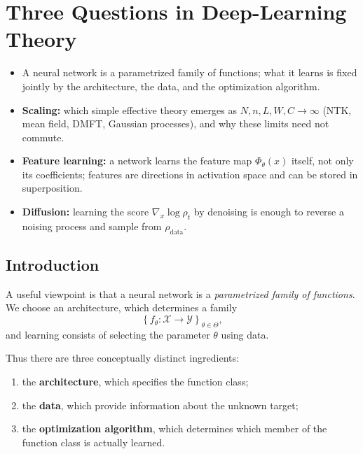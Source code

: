 \chapter{Three Questions in Deep-Learning Theory}
\label{ch:lecture1}

\begin{keyideas}
\begin{itemize}
    \item A neural network is a parametrized family of functions; what it
    learns is fixed jointly by the architecture, the data, and the
    optimization algorithm.
    \item \textbf{Scaling:} which simple effective theory emerges as
    $N,n,L,W,C\to\infty$ (NTK, mean field, DMFT, Gaussian processes), and
    why these limits need not commute.
    \item \textbf{Feature learning:} a network learns the feature map
    $\Phi_\theta(x)$ itself, not only its coefficients; features are
    directions in activation space and can be stored in superposition.
    \item \textbf{Diffusion:} learning the score $\nabla_x\log\rho_t$ by
    denoising is enough to reverse a noising process and sample from
    $\rho_{\mathrm{data}}$.
\end{itemize}
\end{keyideas}

\section{Introduction}

A useful viewpoint is that a neural network is a \emph{parametrized family of functions}. 
We choose an architecture, which determines a family
\begin{equation}
    \left\{
    f_\theta:\mathcal X\rightarrow\mathcal Y
    \right\}_{\theta\in\Theta},
\end{equation}
and learning consists of selecting the parameter $\theta$ using data.

Thus there are three conceptually distinct ingredients:
\begin{enumerate}
    \item the \textbf{architecture}, which specifies the function class;
    \item the \textbf{data}, which provide information about the unknown target;
    \item the \textbf{optimization algorithm}, which determines which member of the
    function class is actually learned.
\end{enumerate}

